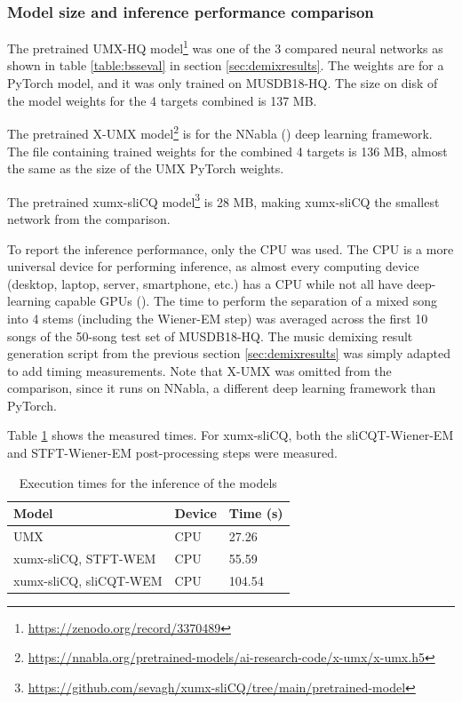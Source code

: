 \documentclass[report.tex]{subfiles}
\begin{document}
\newpagefill

\subsubsection{Model size and inference performance comparison}
\label{sec:inferenceperf}

The pretrained UMX-HQ model\footnote{\url{https://zenodo.org/record/3370489}} was one of the 3 compared neural networks as shown in table \ref{table:bsseval} in section \ref{sec:demixresults}. The weights are for a PyTorch model, and it was only trained on MUSDB18-HQ. The size on disk of the model weights for the 4 targets combined is 137 MB.

The pretrained X-UMX model\footnote{\url{https://nnabla.org/pretrained-models/ai-research-code/x-umx/x-umx.h5}} is for the NNabla (\cite{nnabla}) deep learning framework. The file containing trained weights for the combined 4 targets is 136 MB, almost the same as the size of the UMX PyTorch weights.

The pretrained xumx-sliCQ model\footnote{\url{https://github.com/sevagh/xumx-sliCQ/tree/main/pretrained-model}} is 28 MB, making xumx-sliCQ the smallest network from the comparison.

To report the inference performance, only the CPU was used. The CPU is a more universal device for performing inference, as almost every computing device (desktop, laptop, server, smartphone, etc.) has a CPU while not all have deep-learning capable GPUs (\cite{deepcpuinf, deepcpuinf2}). The time to perform the separation of a mixed song into 4 stems (including the Wiener-EM step) was averaged across the first 10 songs of the 50-song test set of MUSDB18-HQ. The music demixing result generation script from the previous section \ref{sec:demixresults} was simply adapted to add timing measurements. Note that X-UMX was omitted from the comparison, since it runs on NNabla, a different deep learning framework than PyTorch.

Table \ref{table:infperf} shows the measured times. For xumx-sliCQ, both the sliCQT-Wiener-EM and STFT-Wiener-EM post-processing steps were measured.

\begin{table}[ht]
	\centering
	\begin{tabular}{ |l|l|l| }
	 \hline
		Model & Device & Time (s) \\
	 \hline
	 \hline
		UMX & CPU & 27.26  \\
	 \hline
		xumx-sliCQ, STFT-WEM & CPU & 55.59  \\
	 \hline
		xumx-sliCQ, sliCQT-WEM & CPU & 104.54  \\
	 \hline
\end{tabular}
	\caption{Execution times for the inference of the models}
	\label{table:infperf}
\end{table}
\end{document}
